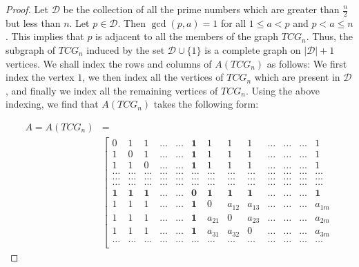 \documentclass[12pt]{article}
\begin{document}
	\begin{proof}
		Let $\mathcal{D}$ be the collection of all the prime numbers which are greater than $\frac{n}{2}$ but less than $n$. Let $p\in \mathcal{D}$. 
		Then $\gcd(p,a)=1$ for all $1\le a< p$ and $p<a\le n$.
		This implies that $p$ is adjacent to all the members of the graph $TCG_n$.
		Thus, the subgraph of $TCG_n$ induced by the set $\mathcal{D}\cup \{1\}$ is a complete graph on $|\mathcal{D}|+1$ vertices.
		We shall index the rows and columns of $A(TCG_n)$ as follows:
		We first index the vertex $1$, we then index all the vertices of $TCG_n$ which are present in $\mathcal{D}$, and finally we index all the remaining vertices of 
		$TCG_n$.
		Using the above indexing, we find that $A(TCG_n)$ takes the following form:
		
		\begin{equation}
			\label{Eq0}
			\begin{split}
				A=A(TCG_n)&=
				\\
				&
				\left[
				\begin{array}{cccccccccccccccccc}
					0 & 1 & 1& \ldots &\dots & \textbf{1}&1 & 1 & 1& \ldots&\ldots &\ldots& 1\\
					1 & 0 & 1& \ldots &\dots &\textbf{1}&1 & 1 & 1& \ldots &\ldots&\ldots& 1\\
					1& 1 & 0 &\ldots&\dots& \textbf{1}&1 & 1 & 1& \ldots &\ldots&\ldots& 1\\
					\ldots& \ldots &\ldots &\ldots&\ldots& \ldots &\ldots &\ldots&\ldots&\ldots&\ldots&\ldots&\ldots\\
					\ldots& \ldots &\ldots &\ldots&\ldots& \ldots &\ldots &\ldots&\ldots&\ldots&\ldots&\ldots&\ldots\\
					\ldots& \ldots &\ldots &\ldots&\ldots& \ldots &\ldots &\ldots&\ldots&\ldots&\ldots&\ldots&\ldots\\
					\textbf{1}& \textbf{1} &\textbf{1}&\ldots &\ldots& \textbf{0} &\textbf{1} & \textbf{1} & \textbf{1}& \ldots &\ldots&\ldots& \textbf{1}\\
					1 & 1 &1  & \ldots&\ldots&\textbf{1} & 0 & a_{12} &a_{13}& \ldots&\ldots&\ldots&a_{1m}\\
					1 & 1 &1 & \ldots&\ldots & \textbf{1}& a_{21} & 0 &a_{23}& \ldots&\ldots&\ldots&a_{2m}\\
					1& 1 & 1 &\ldots&\dots& \textbf{1}&a_{31} & a_{32} & 0& \ldots &\ldots&\ldots& a_{3m}\\
					\ldots& \ldots &\ldots &\ldots&\ldots& \ldots &\ldots &\ldots&\ldots& \ldots&\ldots&\ldots&\ldots \\

\end{array}
\end{split}
\end{equation}
\end{proof}
\end{document}
